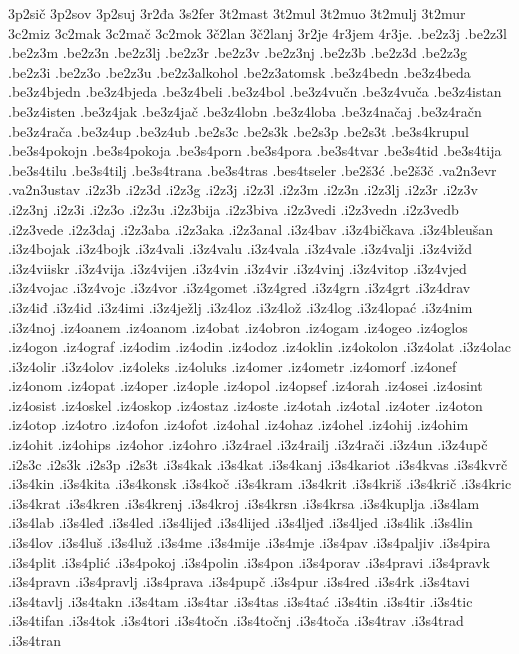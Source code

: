 {3p2sič
3p2sov
3p2suj
3r2đa
3s2fer
3t2mast
3t2mul
3t2muo
3t2mulj
3t2mur
3c2miz
3c2mak
3c2mač
3c2mok
3č2lan
3č2lanj
3r2je
4r3jem
4r3je.
.be2z3j
.be2z3l
.be2z3m
.be2z3n
.be2z3lj
.be2z3r
.be2z3v
.be2z3nj
.be2z3b
.be2z3d
.be2z3g
.be2z3i
.be2z3o
.be2z3u
.be2z3alkohol
.be2z3atomsk
.be3z4bedn
.be3z4beda
.be3z4bjedn
.be3z4bjeda
.be3z4beli
.be3z4bol
.be3z4vučn
.be3z4vuča
.be3z4istan
.be3z4isten
.be3z4jak
.be3z4jač
.be3z4lobn
.be3z4loba
.be3z4načaj
.be3z4račn
.be3z4rača
.be3z4up
.be3z4ub
.be2s3c
.be2s3k
.be2s3p
.be2s3t
.be3s4krupul
.be3s4pokojn
.be3s4pokoja
.be3s4porn
.be3s4pora
.be3s4tvar
.be3s4tid
.be3s4tija
.be3s4tilu
.be3s4tilj
.be3s4trana
.be3s4tras
.bes4tseler
.be2š3ć
.be2š3č
.va2n3evr
.va2n3ustav
.i2z3b
.i2z3d
.i2z3g
.i2z3j
.i2z3l
.i2z3m
.i2z3n
.i2z3lj
.i2z3r
.i2z3v
.i2z3nj
.i2z3i
.i2z3o
.i2z3u
.i2z3bija
.i2z3biva
.i2z3vedi
.i2z3vedn
.i2z3vedb
.i2z3vede
.i2z3daj
.i2z3aba
.i2z3aka
.i2z3anal
.i3z4bav
.i3z4bičkava
.i3z4bleušan
.i3z4bojak
.i3z4bojk
.i3z4vali
.i3z4valu
.i3z4vala
.i3z4vale
.i3z4valji
.i3z4vižd
.i3z4viiskr
.i3z4vija
.i3z4vijen
.i3z4vin
.i3z4vir
.i3z4vinj
.i3z4vitop
.i3z4vjed
.i3z4vojac
.i3z4vojc
.i3z4vor
.i3z4gomet
.i3z4gred
.i3z4grn
.i3z4grt
.i3z4drav
.i3z4iđ
.i3z4id
.i3z4imi
.i3z4ježlj
.i3z4loz
.i3z4lož
.i3z4log
.i3z4lopać
.i3z4nim
.i3z4noj
.iz4oanem
.iz4oanom
.iz4obat
.iz4obron
.iz4ogam
.iz4ogeo
.iz4oglos
.iz4ogon
.iz4ograf
.iz4odim
.iz4odin
.iz4odoz
.iz4oklin
.iz4okolon
.i3z4olat
.i3z4olac
.i3z4olir
.i3z4olov
.iz4oleks
.iz4oluks
.iz4omer
.iz4ometr
.iz4omorf
.iz4onef
.iz4onom
.iz4opat
.iz4oper
.iz4ople
.iz4opol
.iz4opsef
.iz4orah
.iz4osei
.iz4osint
.iz4osist
.iz4oskel
.iz4oskop
.iz4ostaz
.iz4oste
.iz4otah
.iz4otal
.iz4oter
.iz4oton
.iz4otop
.iz4otro
.iz4ofon
.iz4ofot
.iz4ohal
.iz4ohaz
.iz4ohel
.iz4ohij
.iz4ohim
.iz4ohit
.iz4ohips
.iz4ohor
.iz4ohro
.i3z4rael
.i3z4railj
.i3z4rači
.i3z4un
.i3z4upč
.i2s3c
.i2s3k
.i2s3p
.i2s3t
.i3s4kak
.i3s4kat
.i3s4kanj
.i3s4kariot
.i3s4kvas
.i3s4kvrč
.i3s4kin
.i3s4kita
.i3s4konsk
.i3s4koč
.i3s4kram
.i3s4krit
.i3s4kriš
.i3s4krič
.i3s4kric
.i3s4krat
.i3s4kren
.i3s4krenj
.i3s4kroj
.i3s4krsn
.i3s4krsa
.i3s4kuplja
.i3s4lam
.i3s4lab
.i3s4leđ
.i3s4led
.i3s4lijeđ
.i3s4lijed
.i3s4ljeđ
.i3s4ljed
.i3s4lik
.i3s4lin
.i3s4lov
.i3s4luš
.i3s4luž
.i3s4me
.i3s4mije
.i3s4mje
.i3s4pav
.i3s4paljiv
.i3s4pira
.i3s4plit
.i3s4plić
.i3s4pokoj
.i3s4polin
.i3s4pon
.i3s4porav
.i3s4pravi
.i3s4pravk
.i3s4pravn
.i3s4pravlj
.i3s4prava
.i3s4pupč
.i3s4pur
.i3s4red
.i3s4rk
.i3s4tavi
.i3s4tavlj
.i3s4takn
.i3s4tam
.i3s4tar
.i3s4tas
.i3s4tać
.i3s4tin
.i3s4tir
.i3s4tic
.i3s4tifan
.i3s4tok
.i3s4tori
.i3s4točn
.i3s4točnj
.i3s4toča
.i3s4trav
.i3s4trad
.i3s4tran
}
